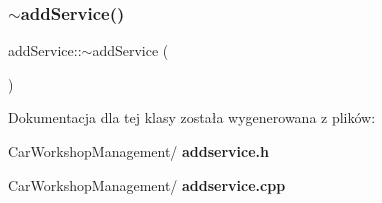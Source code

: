 \subsubsection{$\sim$addService()}
{\footnotesize\ttfamily add\+Service\+::$\sim$add\+Service (\begin{DoxyParamCaption}{ }\end{DoxyParamCaption})}



Dokumentacja dla tej klasy została wygenerowana z plików\+:\begin{DoxyCompactItemize}
\item 
Car\+Workshop\+Management/\textbf{ addservice.\+h}\item 
Car\+Workshop\+Management/\textbf{ addservice.\+cpp}\end{DoxyCompactItemize}
